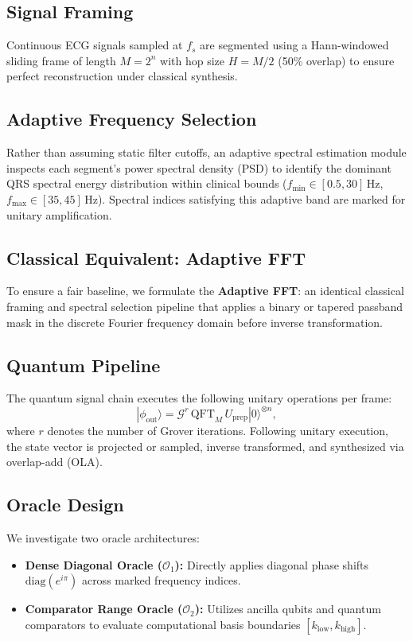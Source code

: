 \documentclass[journal,compsoc]{IEEEtran}
\begin{document}
\subsection{Signal Framing}
Continuous ECG signals sampled at $f_s$ are segmented using a Hann-windowed sliding frame of length $M=2^n$ with hop size $H = M/2$ (50\% overlap) to ensure perfect reconstruction under classical synthesis.

\subsection{Adaptive Frequency Selection}
Rather than assuming static filter cutoffs, an adaptive spectral estimation module inspects each segment's power spectral density (PSD) to identify the dominant QRS spectral energy distribution within clinical bounds ($f_{\text{min}} \in [0.5, 30]$\,Hz, $f_{\text{max}} \in [35, 45]$\,Hz). Spectral indices satisfying this adaptive band are marked for unitary amplification.

\subsection{Classical Equivalent: Adaptive FFT}
To ensure a fair baseline, we formulate the \textbf{Adaptive FFT}: an identical classical framing and spectral selection pipeline that applies a binary or tapered passband mask in the discrete Fourier frequency domain before inverse transformation.

\subsection{Quantum Pipeline}
The quantum signal chain executes the following unitary operations per frame:
\begin{equation}
|\phi_{\text{out}}\rangle = \mathcal{G}^r \, \text{QFT}_M \, U_{\text{prep}} |0\rangle^{\otimes n},
\end{equation}
where $r$ denotes the number of Grover iterations. Following unitary execution, the state vector is projected or sampled, inverse transformed, and synthesized via overlap-add (OLA).

\subsection{Oracle Design}
We investigate two oracle architectures:
\begin{itemize}
    \item \textbf{Dense Diagonal Oracle ($\mathcal{O}_1$):} Directly applies diagonal phase shifts $\text{diag}(e^{i\pi})$ across marked frequency indices.
    \item \textbf{Comparator Range Oracle ($\mathcal{O}_2$):} Utilizes ancilla qubits and quantum comparators to evaluate computational basis boundaries $[k_{\text{low}}, k_{\text{high}}]$.
\end{itemize}
\end{document}
